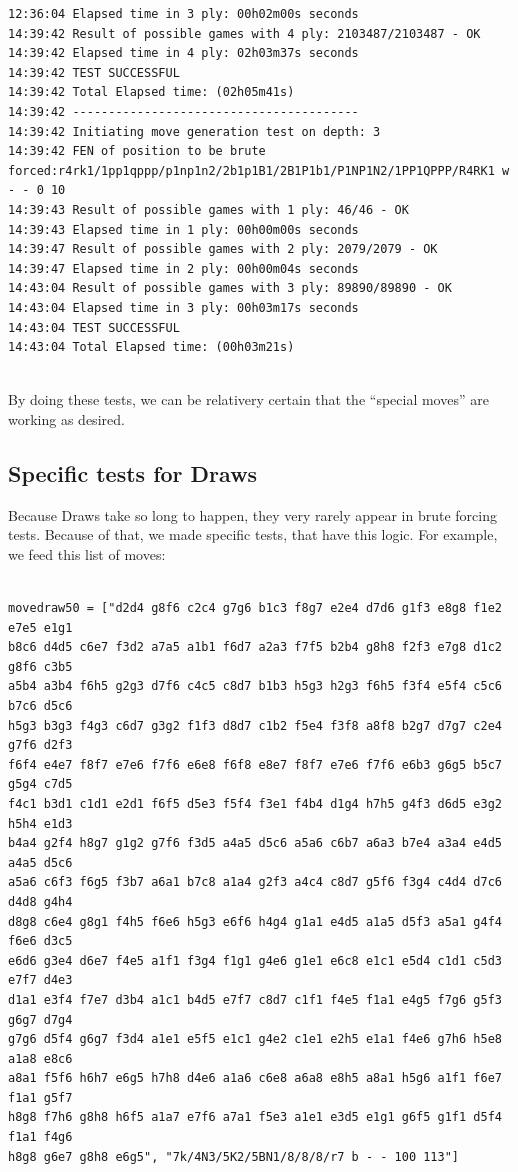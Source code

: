 \documentclass[10pt]{article}
\begin{document}
\begin{lstlisting}
12:36:04 Elapsed time in 3 ply: 00h02m00s seconds
14:39:42 Result of possible games with 4 ply: 2103487/2103487 - OK
14:39:42 Elapsed time in 4 ply: 02h03m37s seconds
14:39:42 TEST SUCCESSFUL
14:39:42 Total Elapsed time: (02h05m41s)
14:39:42 ----------------------------------------
14:39:42 Initiating move generation test on depth: 3
14:39:42 FEN of position to be brute forced:r4rk1/1pp1qppp/p1np1n2/2b1p1B1/2B1P1b1/P1NP1N2/1PP1QPPP/R4RK1 w - - 0 10
14:39:43 Result of possible games with 1 ply: 46/46 - OK
14:39:43 Elapsed time in 1 ply: 00h00m00s seconds
14:39:47 Result of possible games with 2 ply: 2079/2079 - OK
14:39:47 Elapsed time in 2 ply: 00h00m04s seconds
14:43:04 Result of possible games with 3 ply: 89890/89890 - OK
14:43:04 Elapsed time in 3 ply: 00h03m17s seconds
14:43:04 TEST SUCCESSFUL
14:43:04 Total Elapsed time: (00h03m21s)
    
\end{lstlisting}

By doing these tests, we can be relativery certain that the ``special moves'' are working
as desired.

\subsection{Specific tests for Draws}

Because Draws take so long to happen, they very rarely appear in brute forcing
tests. Because of that, we made specific tests, that have this logic.
For example, we feed this list of moves: 

\begin{lstlisting}

movedraw50 = ["d2d4 g8f6 c2c4 g7g6 b1c3 f8g7 e2e4 d7d6 g1f3 e8g8 f1e2 e7e5 e1g1
b8c6 d4d5 c6e7 f3d2 a7a5 a1b1 f6d7 a2a3 f7f5 b2b4 g8h8 f2f3 e7g8 d1c2 g8f6 c3b5
a5b4 a3b4 f6h5 g2g3 d7f6 c4c5 c8d7 b1b3 h5g3 h2g3 f6h5 f3f4 e5f4 c5c6 b7c6 d5c6
h5g3 b3g3 f4g3 c6d7 g3g2 f1f3 d8d7 c1b2 f5e4 f3f8 a8f8 b2g7 d7g7 c2e4 g7f6 d2f3
f6f4 e4e7 f8f7 e7e6 f7f6 e6e8 f6f8 e8e7 f8f7 e7e6 f7f6 e6b3 g6g5 b5c7 g5g4 c7d5
f4c1 b3d1 c1d1 e2d1 f6f5 d5e3 f5f4 f3e1 f4b4 d1g4 h7h5 g4f3 d6d5 e3g2 h5h4 e1d3
b4a4 g2f4 h8g7 g1g2 g7f6 f3d5 a4a5 d5c6 a5a6 c6b7 a6a3 b7e4 a3a4 e4d5 a4a5 d5c6
a5a6 c6f3 f6g5 f3b7 a6a1 b7c8 a1a4 g2f3 a4c4 c8d7 g5f6 f3g4 c4d4 d7c6 d4d8 g4h4
d8g8 c6e4 g8g1 f4h5 f6e6 h5g3 e6f6 h4g4 g1a1 e4d5 a1a5 d5f3 a5a1 g4f4 f6e6 d3c5
e6d6 g3e4 d6e7 f4e5 a1f1 f3g4 f1g1 g4e6 g1e1 e6c8 e1c1 e5d4 c1d1 c5d3 e7f7 d4e3
d1a1 e3f4 f7e7 d3b4 a1c1 b4d5 e7f7 c8d7 c1f1 f4e5 f1a1 e4g5 f7g6 g5f3 g6g7 d7g4
g7g6 d5f4 g6g7 f3d4 a1e1 e5f5 e1c1 g4e2 c1e1 e2h5 e1a1 f4e6 g7h6 h5e8 a1a8 e8c6
a8a1 f5f6 h6h7 e6g5 h7h8 d4e6 a1a6 c6e8 a6a8 e8h5 a8a1 h5g6 a1f1 f6e7 f1a1 g5f7
h8g8 f7h6 g8h8 h6f5 a1a7 e7f6 a7a1 f5e3 a1e1 e3d5 e1g1 g6f5 g1f1 d5f4 f1a1 f4g6
h8g8 g6e7 g8h8 e6g5", "7k/4N3/5K2/5BN1/8/8/8/r7 b - - 100 113"]

\end{lstlisting}
\end{document}
